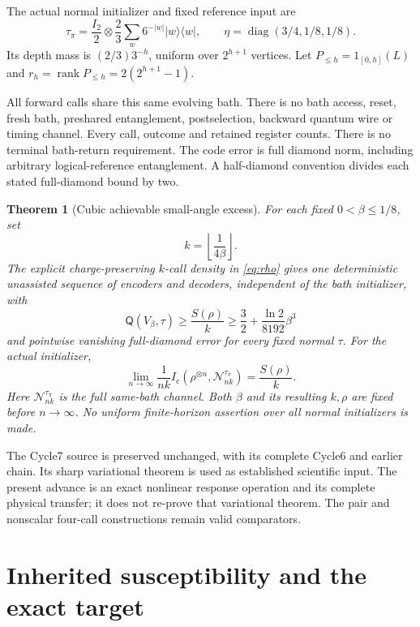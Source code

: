 \documentclass[11pt]{article}
\newtheorem{theorem}{Theorem}[section]
\newcommand{\rank}{\operatorname{rank}}
\newcommand{\ket}[1]{\lvert #1\rangle}
\newcommand{\bra}[1]{\langle #1\rvert}
\newcommand{\Ic}{I_{\mathrm c}}
\newcommand{\Qcap}{\mathsf Q}
\begin{document}
The actual normal initializer and fixed reference input are
\[
 \tau_\pi=\frac{I_2}{2}\otimes\frac23
       \sum_w6^{-|w|}\ket w\bra w,\qquad
 \eta=\operatorname{diag}(3/4,1/8,1/8).
\]
Its depth mass is \((2/3)3^{-h}\), uniform over \(2^{h+1}\) vertices.
Let \(P_{\le h}=1_{[0,h]}(L)\) and
\(r_h=\rank P_{\le h}=2(2^{h+1}-1)\).

All forward calls share this same evolving bath. There is no bath access,
reset, fresh bath, preshared entanglement, postselection, backward quantum
wire or timing channel. Every call, outcome and retained register counts.
There is no terminal bath-return requirement. The code error is full diamond
norm, including arbitrary logical-reference entanglement. A half-diamond
convention divides each stated full-diamond bound by two.

\begin{theorem}[Cubic achievable small-angle excess]\label{thm:rate}
For each fixed \(0<\beta\le1/8\), set
\begin{equation}\label{eq:kchoice}
 k=\left\lfloor\frac1{4\beta}\right\rfloor .
\end{equation}
The explicit charge-preserving \(k\)-call density in
\eqref{eq:rho} gives one deterministic unassisted sequence of encoders and decoders,
independent of the bath initializer, with
\begin{equation}\label{eq:rate}
 \Qcap(V_\beta,\tau)\ge\frac{S(\rho)}k
   \ge\frac32+\frac{\ln2}{8192}\beta^3
\end{equation}
and pointwise vanishing full-diamond error for every fixed normal \(\tau\).
For the actual initializer,
\[
 \lim_{n\to\infty}\frac1{nk}
 \Ic(\rho^{\otimes n},\mathcal N_{nk}^{\tau_\pi})=\frac{S(\rho)}k.
\]
Here \(\mathcal N_{nk}^{\tau_\pi}\) is the full same-bath channel.
Both \(\beta\) and its resulting \(k,\rho\) are fixed before \(n\to\infty\).
No uniform finite-horizon assertion over all normal initializers is made.
\end{theorem}

The Cycle7 source \cite{Cycle7} is preserved unchanged, with its complete
Cycle6 and earlier chain. Its sharp variational theorem is used as established
scientific input. The present advance is an exact nonlinear response
operation and its complete physical transfer; it does not re-prove that
variational theorem. The pair and nonscalar four-call constructions
\cite{Cycle5} remain valid comparators.

\section{Inherited susceptibility and the exact target}
\end{document}
